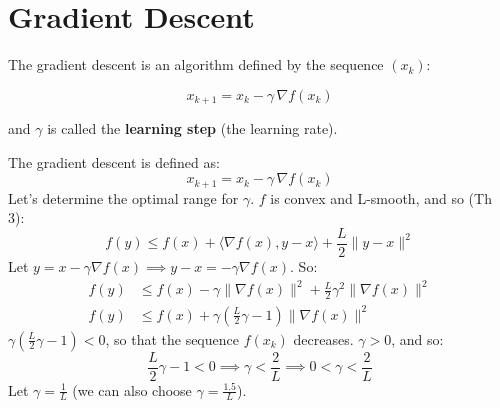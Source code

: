 \chapter{Gradient Descent}
\label{ch:gd}


The gradient descent is an algorithm defined by the sequence $(x_k)$:
\begin{keyformula}
\[
x_{k+1}=x_k-\gamma\,\nabla f(x_k)
\]
\end{keyformula}
\noindent and $\gamma$ is called the \textbf{learning step} (the learning rate).

\begin{center}
\end{center}

The gradient descent is defined as:
\[
x_{k+1}=x_k-\gamma\,\nabla f(x_k)
\]
Let's determine the optimal range for $\gamma$. $f$ is convex and L-smooth, and so (Th 3):
\[
f(y)\le f(x)+\bigl\langle\nabla f(x),y-x\bigr\rangle+\frac{L}{2}\lVert y-x\rVert^2
\]
Let $y=x-\gamma\nabla f(x)\implies y-x=-\gamma\nabla f(x)$. So:
\begin{align*}
f(y)&\le f(x)-\gamma\lVert\nabla f(x)\rVert^2+\frac{L}{2}\gamma^2\lVert\nabla f(x)\rVert^2\\
f(y)&\le f(x)+\gamma\left(\frac{L}{2}\gamma-1\right)\lVert\nabla f(x)\rVert^2
\end{align*}
$\gamma\left(\frac{L}{2}\gamma-1\right)<0$, so that the sequence $f(x_k)$ decreases. $\gamma>0$, and so:
\[
\frac{L}{2}\gamma-1<0\implies\gamma<\frac{2}{L}\implies 0<\gamma<\frac{2}{L}
\]
Let $\gamma=\frac{1}{L}$ (we can also choose $\gamma=\frac{1.5}{L}$).

